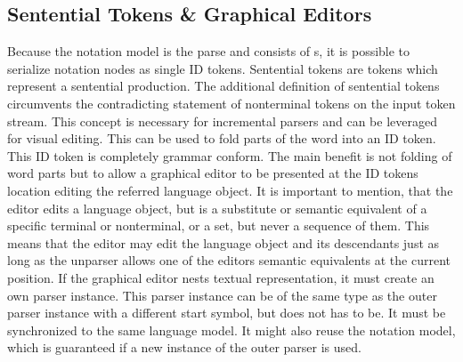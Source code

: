 \subsection{Sentential  Tokens \& Graphical Editors}
Because the notation model is the parse and consists of s, it is possible to serialize notation nodes as single ID tokens. Sentential tokens are tokens which represent a sentential  production. The additional definition of sentential tokens circumvents the contradicting statement of nonterminal tokens on the input token stream. This concept is necessary for incremental parsers and can be leveraged for visual editing. This can be used to fold parts of the word into an ID token. This ID token is completely grammar conform. The main benefit is not folding of word parts but to allow a graphical editor to be presented at the ID tokens location editing the referred language object. It is important to mention, that the editor edits a language object, but is a substitute or semantic equivalent of a specific terminal or nonterminal, or a set, but never a sequence of them. This means that the editor may edit the language object and its descendants just as long as the unparser allows one of the editors semantic equivalents at the current position. If the graphical editor nests textual representation, it must create an own parser instance. This parser instance can be of the same type as the outer parser instance with a different start symbol, but does not has to be. It must be synchronized to the same language model. It might also reuse the notation model, which is guaranteed if a new instance of the outer parser is used.

 \\
 \\
 \\